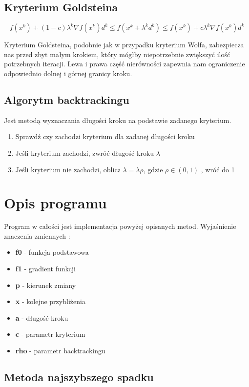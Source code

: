 \documentclass{classrep}
\begin{document}
\subsection{Kryterium Goldsteina}
\begin{equation}
f( x^{k} ) + (1-c) \lambda ^{k} \nabla f(x^{k}) d^{k} \leq f(x^{k}+ \lambda ^{k} d^{k} ) \leq f(x^{k}) + c \lambda ^{k} \nabla f(x^{k} ) d^{k}
\end{equation}

Kryterium Goldsteina, podobnie jak w przypadku kryterium Wolfa, zabezpiecza nas przed zbyt małym krokiem, który mógłby niepotrzebnie zwiększyć ilość potrzebnych iteracji. Lewa i prawa część nierówności zapewnia nam ograniczenie odpowiednio dolnej i górnej granicy kroku.

\subsection{Algorytm backtrackingu}
Jest metodą wyznaczania długości kroku na podstawie zadanego kryterium.
\begin{enumerate}
\item Sprawdź czy zachodzi kryterium dla zadanej długości kroku
\item Jeśli kryterium zachodzi, zwróć długość kroku $\lambda$
\item Jeśli kryterium nie zachodzi, oblicz $\lambda =\lambda \rho$, gdzie $\rho \in (0,1)$ , wróć do 1
\end{enumerate}



\section{Opis programu}
Program w całości jest implementacja powyżej opisanych metod. 
Wyjaśnienie znaczenia zmiennych :
\begin{itemize}
\item \textbf{f0} - funkcja podstawowa
\item \textbf{f1} - gradient funkcji
\item \textbf{p} - kierunek zmiany
\item \textbf{x} - kolejne przybliżenia
\item \textbf{a} - długość kroku
\item \textbf{c} - parametr kryterium
\item \textbf{rho} - parametr backtrackingu
\end{itemize}

\subsection{Metoda najszybszego spadku}
\end{document}
